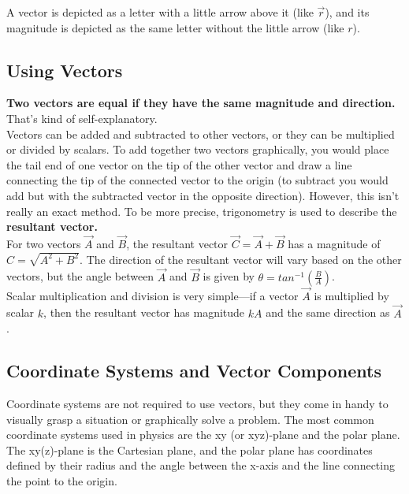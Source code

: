 \documentclass[12pt,letterpaper]{article}
\begin{document}
A vector is depicted as a letter with a little arrow above it (like $\vec{r}$), and its magnitude is depicted as the same letter without the little arrow (like $r$). \\

\subsection[Using Vectors]{Using Vectors}

\textbf{Two vectors are equal if they have the same magnitude and direction.} That's kind of self-explanatory. \\

Vectors can be added and subtracted to other vectors, or they can be multiplied or divided by scalars. To add together two vectors graphically, you would place the tail end of one vector on the tip of the other vector and draw a line connecting the tip of the connected vector to the origin (to subtract you would add but with the subtracted vector in the opposite direction). However, this isn't really an exact method. To be more precise, trigonometry is used to describe the \textbf{resultant vector.} \\

For two vectors $\vec{A}$ and $\vec{B}$, the resultant vector $\vec{C} = \vec{A} + \vec{B}$ has a magnitude of $C = \sqrt{A^{2} + B^{2}}$. The direction of the resultant vector will vary based on the other vectors, but the angle between $\vec{A}$ and $\vec{B}$ is given by $\theta = tan^{-1}(\frac{B}{A})$. \\

Scalar multiplication and division is very simple---if a vector $\vec{A}$ is multiplied by scalar $k$, then the resultant vector has magnitude $kA$ and the same direction as $\vec{A}$.

\subsection{Coordinate Systems and Vector Components}

Coordinate systems are not required to use vectors, but they come in handy to visually grasp a situation or graphically solve a problem. The most common coordinate systems used in physics are the xy (or xyz)-plane and the polar plane. The xy(z)-plane is the Cartesian plane, and the polar plane has coordinates defined by their radius and the angle between the x-axis and the line connecting the point to the origin. \\
\end{document}
